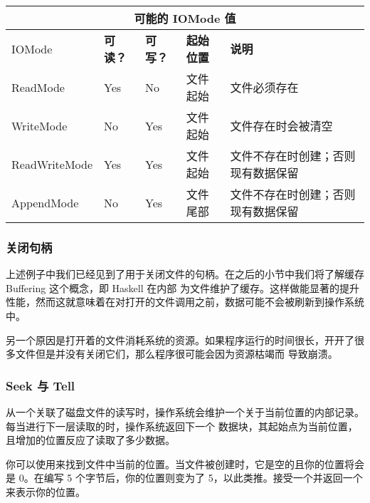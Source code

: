\documentclass[./main.tex]{subfiles}
\begin{document}
\begin{center}
  \begin{tabular}{|l|l|l|l|l|}
    \hline
    \multicolumn{5}{|c|}{\textbf{可能的 IOMode 值}}                                                            \\
    \hline
    IOMode        & \textbf{可读？} & \textbf{可写？} & \textbf{起始位置} & \textbf{说明}                      \\
    \hline
    ReadMode      & Yes             & No              & 文件起始          & 文件必须存在                       \\
    WriteMode     & No              & Yes             & 文件起始          & 文件存在时会被清空                 \\
    ReadWriteMode & Yes             & Yes             & 文件起始          & 文件不存在时创建；否则现有数据保留 \\
    AppendMode    & No              & Yes             & 文件尾部          & 文件不存在时创建；否则现有数据保留 \\
    \hline
  \end{tabular}
\end{center}

\subsubsection*{关闭句柄}

上述例子中我们已经见到了用于关闭文件的句柄。在之后的小节中我们将了解缓存 Buffering 这个概念，即 Haskell 在内部
为文件维护了缓存。这样做能显著的提升性能，然而这就意味着在对打开的文件调用之前，数据可能不会被刷新到操作系统中。

另一个原因是打开着的文件消耗系统的资源。如果程序运行的时间很长，开开了很多文件但是并没有关闭它们，那么程序很可能会因为资源枯竭而
导致崩溃。

\subsubsection*{Seek 与 Tell}

从一个关联了磁盘文件的读写时，操作系统会维护一个关于当前位置的内部记录。每当进行下一层读取的时，操作系统返回下一个
数据块，其起始点为当前位置，且增加的位置反应了读取了多少数据。

你可以使用来找到文件中当前的位置。当文件被创建时，它是空的且你的位置将会是 0。在编写 5 个字节后，你的位置则变为了
5，以此类推。接受一个并返回一个来表示你的位置。
\end{document}
